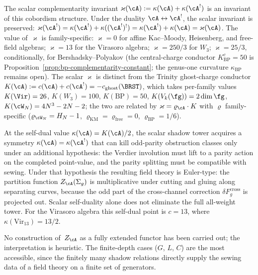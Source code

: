 \begin{remark}
The scalar complementarity invariant
$\varkappa(\cA) := \kappa(\cA) + \kappa(\cA^!)$
is an invariant of this cobordism structure.
Under the duality $\cA \leftrightarrow \cA^!$,
the scalar invariant is preserved:
$\varkappa(\cA^!) = \kappa(\cA^!) + \kappa((\cA^!)^!) = \kappa(\cA^!) + \kappa(\cA) = \varkappa(\cA)$.
The value of~$\varkappa$ is family-specific:
$\varkappa = 0$ for affine Kac--Moody, Heisenberg, and free-field algebras;
$\varkappa = 13$ for the Virasoro algebra;
$\varkappa = 250/3$ for $W_3$;
$\varkappa = 25/3$, conditionally, for Bershadsky--Polyakov
(the central-charge conductor $K^c_{\mathrm{BP}} = 50$ is
Proposition~\ref{prop:bp-complementarity-constant}; the genus-one
curvature $\kappa_{\mathrm{BP}}$ remains open).
The scalar $\varkappa$ is distinct from the Trinity ghost-charge
conductor $K(\cA) := c(\cA) + c(\cA^!) = -c_{\mathrm{ghost}}(\BRST)$,
which takes per-family values $K(\Vir) = 26$, $K(W_3) = 100$,
$K(\mathrm{BP}) = 50$, $K(V_k(\fg)) = 2\dim\fg$, $K(\cW_N) = 4N^3 - 2N - 2$;
the two are related by $\varkappa = \varrho_{\cA} \cdot K$ with $\varrho$
family-specific ($\varrho_{\cW_N} = H_N - 1$,
$\varrho_{\mathrm{KM}} = \varrho_{\mathrm{free}} = 0$,
$\varrho_{\mathrm{BP}} = 1/6$).

At the self-dual value $\kappa(\cA) = K(\cA)/2$,
the scalar shadow tower acquires a symmetry
$\kappa(\cA) = \kappa(\cA^!)$
that can kill odd-parity obstruction classes only under an additional
hypothesis: the Verdier involution must lift to a parity action on the
completed point-value, and the parity splitting must be compatible
with sewing. Under that hypothesis the resulting field theory is
Euler-type:
the partition function $Z_\cA(\Sigma_g)$ is multiplicative
under cutting and gluing along separating curves,
because the odd part of the cross-channel correction
$\delta F_g^{\mathrm{cross}}$ is projected out. Scalar self-duality
alone does not eliminate the full all-weight tower.
For the Virasoro algebra this self-dual point is
$c = 13$, where $\kappa(\mathrm{Vir}_{13}) = 13/2$.

No construction of~$Z_\cA$ as a fully extended functor has been
carried out; the interpretation is heuristic.
The finite-depth cases ($G$, $L$, $C$) are the most accessible,
since the finitely many shadow relations directly supply the
sewing data of a field theory on a finite set of generators.


\end{remark}
